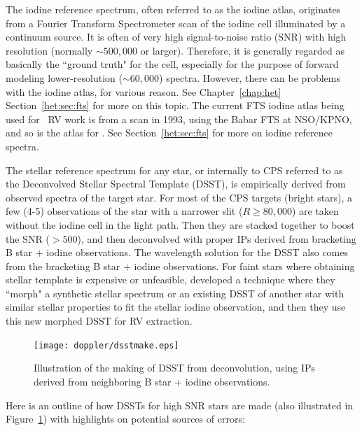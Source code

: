 The iodine reference spectrum, often referred to as the iodine atlas,
originates from a Fourier Transform Spectrometer scan of the iodine
cell illuminated by a continuum source. It is often of very high
signal-to-noise ratio (SNR) with high resolution (normally $\sim
500,000$ or larger). Therefore, it is generally regarded as basically
the ``ground truth" for the cell, especially for the purpose of
forward modeling lower-resolution ($\sim 60,000$) spectra. However,
there can be problems with the iodine atlas, for various reason. See
Chapter~\ref{chap:het} Section~\ref{het:sec:fts} for more on this
topic. The current FTS iodine atlas being used for \keck\ RV work is
from a scan in 1993, using the Babar FTS at NSO/KPNO, and so is the
atlas for \het. See Section~\ref{het:sec:fts} for more on iodine
reference spectra.

The stellar reference spectrum for any star, or internally to CPS
referred to as the Deconvolved Stellar Spectral Template (DSST), is
empirically derived from observed spectra of the target star. For most
of the CPS targets (bright stars), a few (4-5) observations of the
star with a narrower slit ($R \geq 80,000$) are taken without the
iodine cell in the light path. Then they are stacked together to boost
the SNR ($>500$), and then deconvolved with proper IPs derived from
bracketing B star $+$ iodine observations. The wavelength solution for
the DSST also comes from the bracketing B star $+$ iodine
observations. For faint stars where obtaining stellar
template is expensive or unfeasible, \cite{2006ApJ...647..600J}
developed a technique where they ``morph" a synthetic stellar spectrum
or an existing DSST of another star with similar stellar properties to
fit the stellar iodine observation, and then they use this new morphed
DSST for RV extraction.


\begin{figure}
\centering
\texttt{[image: doppler/dsstmake.eps]}
\caption{Illustration of the making of DSST from deconvolution, using
  IPs derived from neighboring B star $+$ iodine observations.
\label{doppler:fig:dsstmake}}
\end{figure}


Here is an outline of how DSSTs for high SNR stars are made (also
illustrated in Figure~\ref{doppler:fig:dsstmake}) with highlights on
potential sources of errors: 

